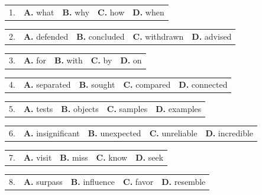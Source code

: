 \documentclass[UTF8,11pt]{ctexart}
\begin{document}
\noindent\begin{tabularx}{\linewidth}{@{}lXXXX@{}}1. & \textbf{A.} what & \textbf{B.} why & \textbf{C.} how & \textbf{D.} when\\\end{tabularx}\par

\noindent\begin{tabularx}{\linewidth}{@{}lXXXX@{}}2. & \textbf{A.} defended & \textbf{B.} concluded & \textbf{C.} withdrawn & \textbf{D.} advised\\\end{tabularx}\par

\noindent\begin{tabularx}{\linewidth}{@{}lXXXX@{}}3. & \textbf{A.} for & \textbf{B.} with & \textbf{C.} by & \textbf{D.} on\\\end{tabularx}\par

\noindent\begin{tabularx}{\linewidth}{@{}lXXXX@{}}4. & \textbf{A.} separated & \textbf{B.} sought & \textbf{C.} compared & \textbf{D.} connected\\\end{tabularx}\par

\noindent\begin{tabularx}{\linewidth}{@{}lXXXX@{}}5. & \textbf{A.} tests & \textbf{B.} objects & \textbf{C.} samples & \textbf{D.} examples\\\end{tabularx}\par

\noindent\begin{tabularx}{\linewidth}{@{}lXXXX@{}}6. & \textbf{A.} insignificant & \textbf{B.} unexpected & \textbf{C.} unreliable & \textbf{D.} incredible\\\end{tabularx}\par

\noindent\begin{tabularx}{\linewidth}{@{}lXXXX@{}}7. & \textbf{A.} visit & \textbf{B.} miss & \textbf{C.} know & \textbf{D.} seek\\\end{tabularx}\par

\noindent\begin{tabularx}{\linewidth}{@{}lXXXX@{}}8. & \textbf{A.} surpass & \textbf{B.} influence & \textbf{C.} favor & \textbf{D.} resemble\\\end{tabularx}\par
\end{document}
